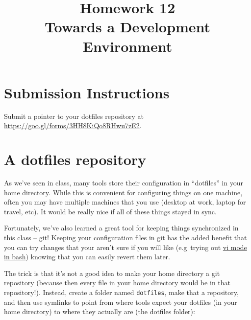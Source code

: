 \documentclass{article}
\begin{document}

\fancyfoot[C]{\color{gray} \thepage~/~\pageref*{LastPage}}
\pagestyle{fancyplain}



\title{\textbf{Homework 12\\Towards a Development Environment}}
\author{\textbf{\color{red}{Due: Wednesday, November 22, 11:59PM (Hard Deadline)}}}
\date{}
\maketitle


\section*{Submission Instructions}
Submit a pointer to your dotfiles repository at
\href{https://goo.gl/forms/3HH8KiQo8RHwu7zE2}{https://goo.gl/forms/3HH8KiQo8RHwu7zE2}.

\section{A dotfiles repository}

As we've seen in class, many tools store their configuration in ``dotfiles''
in your home directory. While this is convenient for configuring things on one
machine, often you may have multiple machines that you use (desktop at
work, laptop for travel, etc). It would be really nice if all of these things
stayed in sync.

Fortunately, we've also learned a great tool for keeping things synchronized
in this class -- git! Keeping your configuration files in git has the added
benefit that you can try changes that your aren't sure if you will like
(e.g\ trying out \href{http://blog.sanctum.geek.nz/vi-mode-in-bash/}{vi mode
in bash}) knowing that you can easily revert them later.

The trick is that it's not a good idea to make your home directory a git
repository (because then every file in your home directory would be in that
repository!). Instead, create a folder named \texttt{dotfiles}, make that a
repository, and then use symlinks to point from where tools expect your
dotfiles (in your home directory) to where they actually are (the dotfiles
folder):
\end{document}
